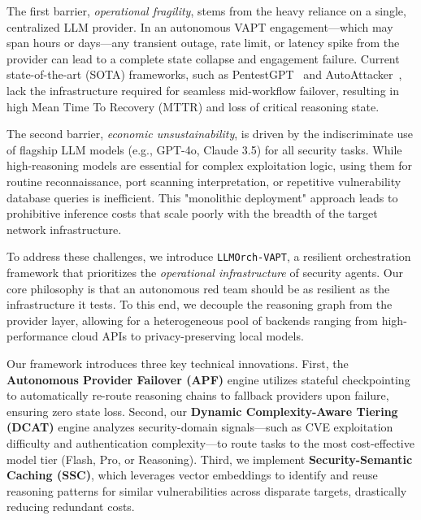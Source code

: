 The first barrier, \textit{operational fragility}, stems from the heavy reliance on a single, centralized LLM provider. In an autonomous VAPT engagement—which may span hours or days—any transient outage, rate limit, or latency spike from the provider can lead to a complete state collapse and engagement failure. Current state-of-the-art (SOTA) frameworks, such as PentestGPT~\cite{pentestgpt} and AutoAttacker~\cite{autoattacker}, lack the infrastructure required for seamless mid-workflow failover, resulting in high Mean Time To Recovery (MTTR) and loss of critical reasoning state.

The second barrier, \textit{economic unsustainability}, is driven by the indiscriminate use of flagship LLM models (e.g., GPT-4o, Claude 3.5) for all security tasks. While high-reasoning models are essential for complex exploitation logic, using them for routine reconnaissance, port scanning interpretation, or repetitive vulnerability database queries is inefficient. This "monolithic deployment" approach leads to prohibitive inference costs that scale poorly with the breadth of the target network infrastructure.

To address these challenges, we introduce \texttt{LLMOrch-VAPT}, a resilient orchestration framework that prioritizes the \textit{operational infrastructure} of security agents. Our core philosophy is that an autonomous red team should be as resilient as the infrastructure it tests. To this end, we decouple the reasoning graph from the provider layer, allowing for a heterogeneous pool of backends ranging from high-performance cloud APIs to privacy-preserving local models.

Our framework introduces three key technical innovations. First, the \textbf{Autonomous Provider Failover (APF)} engine utilizes stateful checkpointing to automatically re-route reasoning chains to fallback providers upon failure, ensuring zero state loss. Second, our \textbf{Dynamic Complexity-Aware Tiering (DCAT)} engine analyzes security-domain signals—such as CVE exploitation difficulty and authentication complexity—to route tasks to the most cost-effective model tier (Flash, Pro, or Reasoning). Third, we implement \textbf{Security-Semantic Caching (SSC)}, which leverages vector embeddings to identify and reuse reasoning patterns for similar vulnerabilities across disparate targets, drastically reducing redundant costs.

